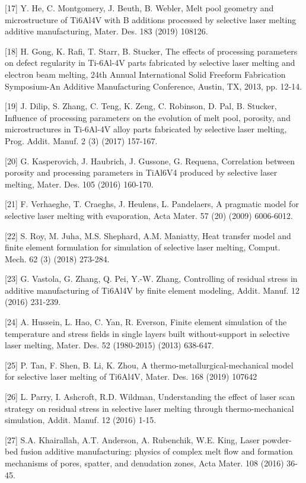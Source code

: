 \documentclass[10pt]{article}
\begin{document}
[17] Y. He, C. Montgomery, J. Beuth, B. Webler, Melt pool geometry and microstructure of Ti6Al4V with B additions processed by selective laser melting additive manufacturing, Mater. Des. 183 (2019) 108126.

[18] H. Gong, K. Rafi, T. Starr, B. Stucker, The effects of processing parameters on defect regularity in Ti-6Al-4V parts fabricated by selective laser melting and electron beam melting, 24th Annual International Solid Freeform Fabrication Symposium-An Additive Manufacturing Conference, Austin, TX, 2013, pp. 12-14.

[19] J. Dilip, S. Zhang, C. Teng, K. Zeng, C. Robinson, D. Pal, B. Stucker, Influence of processing parameters on the evolution of melt pool, porosity, and microstructures in Ti-6Al-4V alloy parts fabricated by selective laser melting, Prog. Addit. Manuf. 2 (3) (2017) 157-167.

[20] G. Kasperovich, J. Haubrich, J. Gussone, G. Requena, Correlation between porosity and processing parameters in TiAl6V4 produced by selective laser melting, Mater. Des. 105 (2016) 160-170.

[21] F. Verhaeghe, T. Craeghs, J. Heulens, L. Pandelaers, A pragmatic model for selective laser melting with evaporation, Acta Mater. 57 (20) (2009) 6006-6012.

[22] S. Roy, M. Juha, M.S. Shephard, A.M. Maniatty, Heat transfer model and finite element formulation for simulation of selective laser melting, Comput. Mech. 62 (3) (2018) 273-284.

[23] G. Vastola, G. Zhang, Q. Pei, Y.-W. Zhang, Controlling of residual stress in additive manufacturing of Ti6Al4V by finite element modeling, Addit. Manuf. 12 (2016) 231-239.

[24] A. Hussein, L. Hao, C. Yan, R. Everson, Finite element simulation of the temperature and stress fields in single layers built without-support in selective laser melting, Mater. Des. 52 (1980-2015) (2013) 638-647.

[25] P. Tan, F. Shen, B. Li, K. Zhou, A thermo-metallurgical-mechanical model for selective laser melting of Ti6Al4V, Mater. Des. 168 (2019) 107642

[26] L. Parry, I. Ashcroft, R.D. Wildman, Understanding the effect of laser scan strategy on residual stress in selective laser melting through thermo-mechanical simulation, Addit. Manuf. 12 (2016) 1-15.

[27] S.A. Khairallah, A.T. Anderson, A. Rubenchik, W.E. King, Laser powder-bed fusion additive manufacturing: physics of complex melt flow and formation mechanisms of pores, spatter, and denudation zones, Acta Mater. 108 (2016) 36-45.
\end{document}
